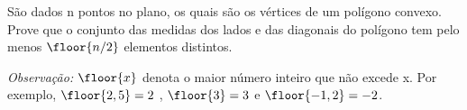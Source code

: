São dados n pontos no plano, os quais são os vértices de um polígono convexo.
Prove que o conjunto das medidas dos lados e das diagonais do polígono tem pelo menos $\floor{n / 2}$ elementos distintos.

\textit{Observação:} $\floor{x}$ denota o maior número inteiro que não excede x. Por exemplo, $\floor{2,5} = 2$ , $\floor{3} = 3$ e $\floor{-1,2} = -2$.